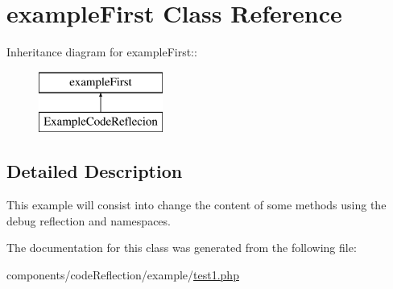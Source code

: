 \hypertarget{classexample_first}{
\section{exampleFirst Class Reference}
\label{classexample_first}
}
Inheritance diagram for exampleFirst::\begin{figure}[H]
\begin{center}
\leavevmode
\includegraphics[height=2cm]{classexample_first}
\end{center}
\end{figure}


\subsection{Detailed Description}
This example will consist into change the content of some methods using the debug reflection and namespaces. 

The documentation for this class was generated from the following file:\begin{CompactItemize}
\item 
components/codeReflection/example/\hyperlink{code_reflection_2example_2test1_8php}{test1.php}\end{CompactItemize}
